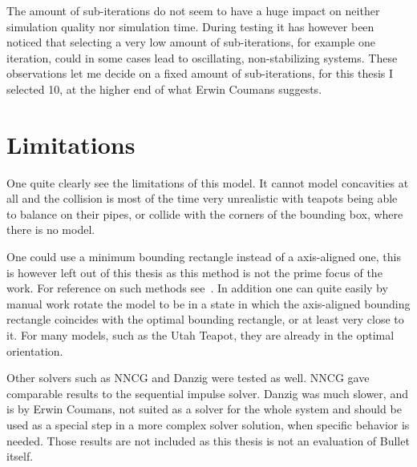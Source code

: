 The amount of sub-iterations do not seem to have a huge impact on neither simulation
quality nor simulation time.
During testing it has however been noticed that selecting a very low amount of
sub-iterations, for example one iteration, could in some cases lead to oscillating,
 non-stabilizing systems. These observations let me decide on a fixed amount of sub-iterations, for
this thesis I selected 10, at the higher end of what Erwin Coumans suggests.

\section{Limitations}
One quite clearly see the limitations of this model. It cannot model concavities
at all and the collision is most of the time very unrealistic with teapots being
able to balance on their pipes, or collide with the corners of the bounding box,
where there is no model.

One could use a minimum bounding rectangle instead of a
axis-aligned one, this is however left out of this thesis as this method is not
the prime focus of the work. For reference on such methods see~\cite{minBounding}.
In addition one can quite easily by manual work rotate the model to be in a state
 in which the axis-aligned bounding
rectangle coincides with the optimal bounding rectangle, or at least very close
to it. For many models, such as the Utah Teapot, they are already in the optimal
orientation.

Other solvers such as NNCG and Danzig were tested as well. NNCG gave comparable
results to the sequential impulse solver. Danzig was much slower, and is by
Erwin Coumans, not suited as a solver for the whole system and should be used as
a special step in a more complex solver solution, when specific behavior is needed.
Those results are not included as this thesis is not an evaluation of Bullet itself.
